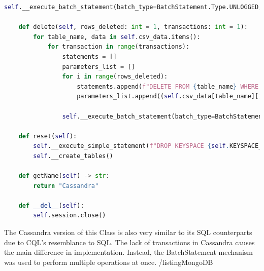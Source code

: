 \begin{lstlisting}[language=Python, caption=CassandraDatabaseTesting]
                self.__execute_batch_statement(batch_type=BatchStatement.Type.UNLOGGED, statements=statements, parameters_list=parameters_list)

    def delete(self, rows_deleted: int = 1, transactions: int = 1):
        for table_name, data in self.csv_data.items():
            for transaction in range(transactions):
                statements = []
                parameters_list = []
                for i in range(rows_deleted):
                    statements.append(f"DELETE FROM {table_name} WHERE {self.table_column_names[table_name][0]} = %s AND {self.table_column_names[table_name][1]} = %s")
                    parameters_list.append((self.csv_data[table_name][i][0], self.csv_data[table_name][i][1]))

                self.__execute_batch_statement(batch_type=BatchStatement.Type.UNLOGGED, statements=statements, parameters_list=parameters_list)

    def reset(self):
        self.__execute_simple_statement(f"DROP KEYSPACE {self.KEYSPACE_NAME}")
        self.__create_tables()

    def getName(self) -> str:
        return "Cassandra"

    def __del__(self):
        self.session.close()
\end{lstlisting}
\par The Cassandra version of this Class is also very similar to its SQL counterparts due to CQL's resemblance to SQL. The lack of transactions in Cassandra causes the main difference in implementation. Instead, the BatchStatement mechanism was used to perform multiple operations at once.
/listing{MongoDB}
